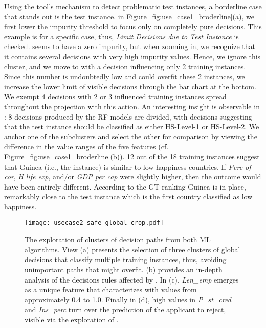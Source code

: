 Using the tool's mechanism to detect problematic test instances, a borderline case that stands out is the  test instance. in Figure~\ref{fig:use_case1_broderline}(a), we first lower the impurity threshold to focus only on completely pure decisions. This example is for a specific case, thus, \emph{Limit Decisions due to Test Instance} is checked.  seems to have a zero impurity, but when zooming in, we recognize that it contains several decisions with very high impurity values. Hence, we ignore this cluster, and we move to  with a decision influencing only 2 training instances. Since this number is undoubtedly low and could overfit these 2 instances, we increase the lower limit of visible decisions through the bar chart at the bottom. We exempt 4 decisions with 2 or 3 influenced training instances spread throughout the projection with this action. An interesting insight is observable in : 8 decisions produced by the RF models are divided, with decisions suggesting that the test instance should be classified as either HS-Level-1 or HS-Level-2. We anchor one of the subclusters and select the other for comparison by viewing the difference in the value ranges of the five features (cf. Figure~\ref{fig:use_case1_broderline}(b)). 12 out of the 18 training instances suggest that Guinea (i.e., the  instance) is similar to low-happiness countries. If \emph{Perc of cor}, \emph{H life exp}, and/or \emph{GDP per cap} were slightly higher, then the outcome would have been entirely different. According to the GT ranking Guinea is in  place, remarkably close to the  test instance which is the first country classified as low happiness.

\begin{figure*}[tb]
  \centering
  \texttt{[image: usecase2\_safe\_global-crop.pdf]}
  \caption{The exploration of clusters of decision paths from both ML algorithms. View (a) presents the selection of three clusters of global decisions that classify multiple training instances, thus, avoiding unimportant paths that might overfit. (b) provides an in-depth analysis of the decisions rules affected by . In (c), \emph{Len\_emp} emerges as a unique feature that characterizes  with values from approximately 0.4 to 1.0. Finally in (d), high values in \emph{P\_st\_cred} and \emph{Ins\_perc} turn over the prediction of the applicant to reject, visible via the exploration of .}
  \label{fig:use_case2_safe_global}
\end{figure*}

